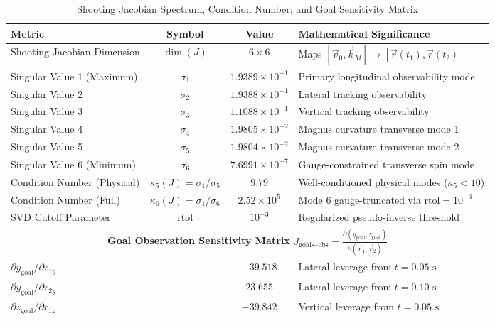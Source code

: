 \begin{table}[htbp]
\centering
\caption{Shooting Jacobian Spectrum, Condition Number, and Goal Sensitivity Matrix}
\label{tab:jacobian_conditioning}
\begin{tabular}{lccl}
\toprule
\textbf{Metric} & \textbf{Symbol} & \textbf{Value} & \textbf{Mathematical Significance} \\
\midrule
Shooting Jacobian Dimension & $\dim(J)$ & $6 \times 6$ & Maps $[\vec{v}_0, \vec{k}_M] \to [\vec{r}(t_1), \vec{r}(t_2)]$ \\
Singular Value 1 (Maximum) & $\sigma_1$ & $1.9389\times 10^{-1}$ & Primary longitudinal observability mode \\
Singular Value 2 & $\sigma_2$ & $1.9388\times 10^{-1}$ & Lateral tracking observability \\
Singular Value 3 & $\sigma_3$ & $1.1088\times 10^{-1}$ & Vertical tracking observability \\
Singular Value 4 & $\sigma_4$ & $1.9805\times 10^{-2}$ & Magnus curvature transverse mode 1 \\
Singular Value 5 & $\sigma_5$ & $1.9804\times 10^{-2}$ & Magnus curvature transverse mode 2 \\
Singular Value 6 (Minimum) & $\sigma_6$ & $7.6991\times 10^{-7}$ & Gauge-constrained transverse spin mode \\
Condition Number (Physical) & $\kappa_5(J) = \sigma_1 / \sigma_5$ & $9.79$ & Well-conditioned physical modes ($\kappa_5 < 10$) \\
Condition Number (Full) & $\kappa_6(J) = \sigma_1 / \sigma_6$ & $2.52\times 10^{5}$ & Mode 6 gauge-truncated via $\text{rtol} = 10^{-3}$ \\
SVD Cutoff Parameter & $\text{rtol}$ & $10^{-3}$ & Regularized pseudo-inverse threshold \\
\midrule
\multicolumn{4}{c}{\textbf{Goal Observation Sensitivity Matrix} $J_{\text{goal} \leftarrow \text{obs}} = \frac{\partial (y_{\text{goal}}, z_{\text{goal}})}{\partial (\vec{r}_1, \vec{r}_2)}$} \\
$\partial y_{\text{goal}} / \partial r_{1y}$ & & $-39.518$ & Lateral leverage from $t = 0.05\text{ s}$ \\
$\partial y_{\text{goal}} / \partial r_{2y}$ & & $23.655$ & Lateral leverage from $t = 0.10\text{ s}$ \\
$\partial z_{\text{goal}} / \partial r_{1z}$ & & $-39.842$ & Vertical leverage from $t = 0.05\text{ s}$ \\

\end{tabular}
\end{table}
